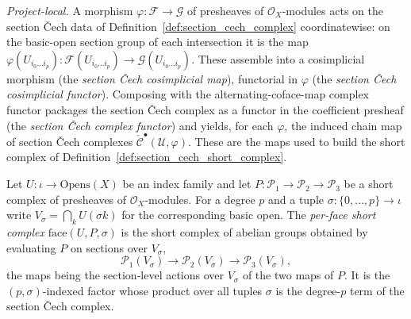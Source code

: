 \begin{definition}
  \label{def:section_cech_functoriality}
  \textit{Project-local.}
  A morphism \(\varphi : \mathcal{F} \to \mathcal{G}\) of presheaves of \(\mathcal{O}_X\)-modules
  acts on the section {\v C}ech data of Definition~\ref{def:section_cech_complex} coordinatewise:
  on the basic-open section group of each intersection it is the map
  \(\varphi(U_{i_0 \ldots i_p}) : \mathcal{F}(U_{i_0 \ldots i_p}) \to \mathcal{G}(U_{i_0 \ldots
  i_p})\). These assemble into a cosimplicial morphism (the \emph{section {\v C}ech cosimplicial
  map}), functorial in \(\varphi\) (the \emph{section {\v C}ech cosimplicial functor}). Composing
  with the alternating-coface-map complex functor packages the section {\v C}ech complex as a
  functor in the coefficient presheaf (the \emph{section {\v C}ech complex functor}) and yields,
  for each \(\varphi\), the induced chain map of section {\v C}ech complexes
  \(\check{\mathcal{C}}^\bullet(\mathcal{U}, \varphi)\). These are the maps used to build the short
  complex of Definition~\ref{def:section_cech_short_complex}.
\end{definition}

\begin{definition}\leanok
  \label{def:face_short_complex}
  Let \(U : \iota \to \mathrm{Opens}(X)\) be an index family and let
  \(P : \mathcal{P}_1 \to \mathcal{P}_2 \to \mathcal{P}_3\) be a short complex of presheaves of
  \(\mathcal{O}_X\)-modules. For a degree \(p\) and a tuple \(\sigma : \{0, \ldots, p\} \to \iota\)
  write \(V_\sigma = \bigcap_k U(\sigma k)\) for the corresponding basic open. The \emph{per-face
  short complex} \(\mathrm{face}(U, P, \sigma)\) is the short complex of abelian groups obtained by
  evaluating \(P\) on sections over \(V_\sigma\),
  \[
    \mathcal{P}_1(V_\sigma) \longrightarrow \mathcal{P}_2(V_\sigma) \longrightarrow
      \mathcal{P}_3(V_\sigma),
  \]
  the maps being the section-level actions over \(V_\sigma\) of the two maps of \(P\). It is the
  \((p, \sigma)\)-indexed factor whose product over all tuples \(\sigma\) is the degree-\(p\) term
  of the section {\v C}ech complex.
\end{definition}

